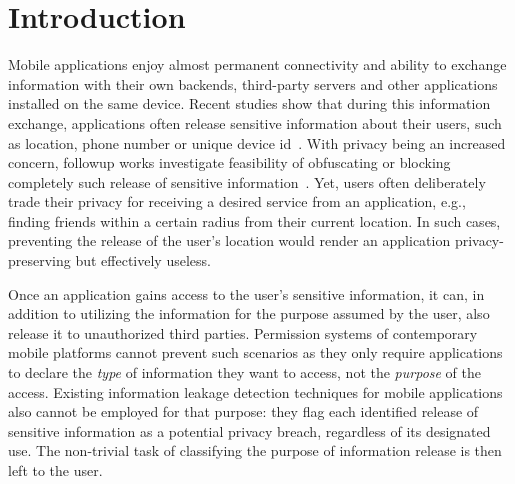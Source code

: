 \section{Introduction}
\label{sec:intro} 
Mobile applications enjoy almost permanent connectivity and ability to exchange information with their own backends, third-party servers and other applications installed on the same device. 
Recent studies show that during this information exchange, applications often release sensitive information about their users, such as location, phone number or unique device id~\cite{Enck:Gilbert:Chun:Cox:Jung:McDaniel:Sheth:OSDI10, Egele:Kruegel:Kirda:Vign:NDSS11,Tripp:Rubin:SEC14}. 
With privacy being an increased concern, followup works investigate feasibility of obfuscating or blocking completely such release of sensitive information~\cite{Hornyack:Han:Jung:Schechter:Wetherall:CCS11}.
Yet, users often deliberately trade their privacy for receiving a desired service from an application, 
e.g., finding friends within a certain radius from their current location. 
In such cases, preventing the release of the user's location would render an application privacy-preserving but effectively useless. 

Once an application gains access to the user's sensitive information, it can, in addition to utilizing the information for the purpose assumed by the user, also release it to unauthorized third parties.
Permission systems of contemporary mobile platforms cannot prevent such scenarios as they only require applications to declare the \emph{type} of information they want to access, not the \emph{purpose} of the access. 
Existing information leakage detection techniques for mobile applications~\cite{Enck:Gilbert:Chun:Cox:Jung:McDaniel:Sheth:OSDI10,Egele:Kruegel:Kirda:Vign:NDSS11,Arzt:Rasthofer:Fritz:Bodden:Bartel:Klein:Traon:Octeau:McDaniel:PLDI14, Tripp:Rubin:SEC14,DroidSafe} 
also cannot be employed for that purpose: they flag each identified release of sensitive information as a potential privacy breach, regardless of its designated use. 
The non-trivial task of classifying the purpose of information release is then left to the user. 


